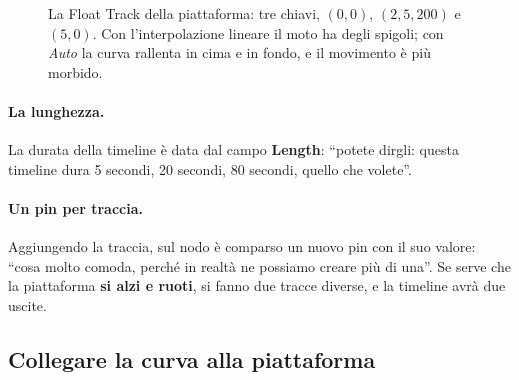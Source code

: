 \begin{figure}[htbp]
\centering
{}
\caption{La Float Track della piattaforma: tre chiavi, $(0, 0)$, $(2{,}5, 200)$
e $(5, 0)$. Con l'interpolazione lineare il moto ha degli spigoli; con
\emph{Auto} la curva rallenta in cima e in fondo, e il movimento è più
morbido.}
\label{gd12:fig:curva}
\end{figure}

\paragraph{La lunghezza.} La durata della timeline è data dal campo
\textbf{Length}: ``potete dirgli: questa timeline dura 5 secondi, 20 secondi,
80 secondi, quello che volete''.

\paragraph{Un pin per traccia.} Aggiungendo la traccia, sul nodo è comparso un
nuovo pin con il suo valore: ``cosa molto comoda, perché in realtà ne possiamo
creare più di una''. Se serve che la piattaforma \textbf{si alzi e ruoti}, si
fanno due tracce diverse, e la timeline avrà due uscite.

\subsection{Collegare la curva alla piattaforma}

